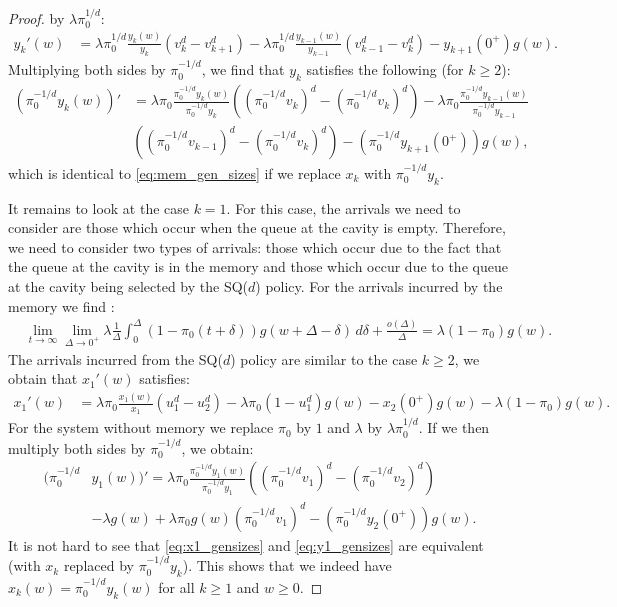\documentclass[12pt]{report}
\begin{document}
\begin{proof}
 by $\lambda \pi_0^{1/d}$:
\begin{align*}
y_k'(w)&= \lambda \pi_0^{1/d} \frac{y_k(w)}{y_k} (v_k^d - v_{k+1}^d) - \lambda \pi_0^{1/d} \frac{y_{k-1}(w)}{y_{k-1}} (v_{k-1}^d-v_k^d) - y_{k+1}(0^+) g(w).
\end{align*}
Multiplying both sides by $\pi_0^{-1/d}$, we find that $y_k$ satisfies the following (for $k\geq 2$):
\begin{align*}
(\pi_0^{-1/d} y_k(w))'
&= \lambda \pi_0 \frac{\pi_0^{-1/d} y_k(w)}{\pi_0^{-1/d} y_k} ((\pi_0^{-1/d}v_k)^d-(\pi_0^{-1/d} v_k)^d) - \lambda \pi_0 \frac{\pi_0^{-1/d} y_{k-1}(w)}{\pi_0^{-1/d}y_{k-1}}\\
& ((\pi_0^{-1/d}v_{k-1})^d 
-(\pi_0^{-1/d}v_k)^d)- (\pi_0^{-1/d} y_{k+1}(0^+)) g(w),
\end{align*}
which is identical to \eqref{eq:mem_gen_sizes} if we replace $x_k$ with $\pi_0^{-1/d} y_k$. 

It remains to look at the case $k=1$. For this case, the arrivals we need to consider are those which occur when the queue at the cavity is empty. Therefore, we need to consider two types of arrivals: those which occur due to the fact that the queue at the cavity is in the memory and those which occur due to the queue at the cavity being selected by the SQ($d$) policy. For the arrivals incurred by the memory we find :
\begin{align*}
&\lim_{t\rightarrow\infty} \lim_{\Delta \rightarrow 0^+} \lambda \frac{1}{\Delta} \int_0^\Delta (1-\pi_0(t+\delta)) g(w+\Delta-\delta) \, d\delta + \frac{o(\Delta)}{\Delta} = \lambda (1-\pi_0) g(w).
\end{align*}
The arrivals incurred from the SQ($d$) policy are similar to the case $k\geq 2$, we obtain that $x_1'(w)$ satisfies:
\begin{align}
x_1'(w)
&= \lambda \pi_0 \frac{x_1(w)}{x_1} (u_1^d - u_2^d) - \lambda \pi_0 (1-u_1^d) g(w)- x_2(0^+) g(w) - \lambda (1-\pi_0) g(w). \label{eq:x1_gensizes}
\end{align}
For the system without memory we replace $\pi_0$ by $1$ and $\lambda$ by
$\lambda \pi_0^{1/d}$. If we then multiply both sides by $\pi_0^{-1/d}$, we obtain:
\begin{align}
(\pi_0^{-1/d} &y_1(w))'
= \lambda \pi_0 \frac{\pi_0^{-1/d} y_1(w)}{\pi_0^{-1/d} y_1} ((\pi_0^{-1/d} v_1)^d-(\pi_0^{-1/d} v_2)^d)\nonumber\\
&-\lambda  g(w) + \lambda \pi_0 g(w) (\pi_0^{-1/d} v_1)^d - (\pi_0^{-1/d}y_2(0^+)) g(w). \label{eq:y1_gensizes}
\end{align}
It is not hard to see that \eqref{eq:x1_gensizes} and \eqref{eq:y1_gensizes} are equivalent (with $x_k$ replaced by $\pi_0^{-1/d} y_k$). This shows that we indeed have $x_k(w)=\pi_0^{-1/d} y_k(w)$ for all $k\geq 1$ and $w\geq 0$.


\end{proof}
\end{document}

